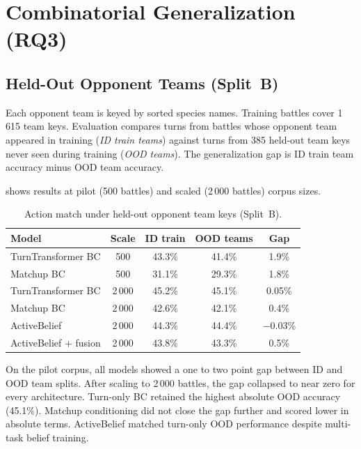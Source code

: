 \section{Combinatorial Generalization (RQ3)}

\subsection{Held-Out Opponent Teams (Split~B)}

Each opponent team is keyed by sorted species names. Training battles cover
1\,615 team keys. Evaluation compares turns from battles whose opponent team
appeared in training (\emph{ID train teams}) against turns from 385 held-out
team keys never seen during training (\emph{OOD teams}). The generalization gap
is ID train team accuracy minus OOD team accuracy.

 shows results at pilot (500 battles) and scaled
(2\,000 battles) corpus sizes.

\begin{table}[ht]
  \centering
  \caption{Action match under held-out opponent team keys (Split~B).}
  \label{tab:ood-teams}
  \begin{tabular}{lcccc}
    \toprule
    Model & Scale & ID train & OOD teams & Gap \\
    \midrule
    TurnTransformer BC & 500 & 43.3\% & 41.4\% & 1.9\% \\
    Matchup BC & 500 & 31.1\% & 29.3\% & 1.8\% \\
    \addlinespace
    TurnTransformer BC & 2\,000 & 45.2\% & 45.1\% & 0.05\% \\
    Matchup BC & 2\,000 & 42.6\% & 42.1\% & 0.4\% \\
    ActiveBelief & 2\,000 & 44.3\% & 44.4\% & $-$0.03\% \\
    ActiveBelief + fusion & 2\,000 & 43.8\% & 43.3\% & 0.5\% \\
    \bottomrule
  \end{tabular}
\end{table}

On the pilot corpus, all models showed a one to two point gap between ID and OOD
team splits. After scaling to 2\,000 battles, the gap collapsed to near zero for
every architecture. Turn-only BC retained the highest absolute OOD accuracy
(45.1\%). Matchup conditioning did not close the gap further and scored lower in
absolute terms. ActiveBelief matched turn-only OOD performance despite multi-task
belief training.

